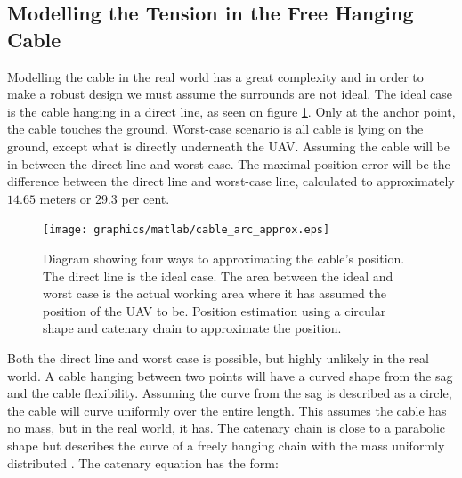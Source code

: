    

\subsection{Modelling the Tension in the Free Hanging Cable}
Modelling the cable in the real world has a great complexity and in order to make a robust design we must assume the surrounds are not ideal. The ideal case is the cable hanging in a direct line, as seen on figure \ref{fig:cable_model_cases}. Only at the anchor point, the cable touches the ground. Worst-case scenario is all cable is lying on the ground, except what is directly underneath the UAV. Assuming the cable will be in between the direct line and worst case. The maximal position error will be the difference between the direct line and worst-case line, calculated to approximately $14.65$ meters or 29.3 per cent.

\newpage

\begin{figure}[H]
\centering
\texttt{[image: graphics/matlab/cable\_arc\_approx.eps]}
\caption[Diagram showing four ways of approximating the cable's position.]{Diagram showing four ways to approximating the cable's position. The direct line is the ideal case. The area between the ideal and worst case is the actual working area where it has assumed the position of the UAV to be. Position estimation using a circular shape and catenary chain to approximate the position.}
\label{fig:cable_model_cases}
\end{figure}

\noindent
Both the direct line and worst case is possible, but highly unlikely in the real world. A cable hanging between two points will have a curved shape from the sag and the cable flexibility. Assuming the curve from the sag is described as a circle, the cable will curve uniformly over the entire length. This assumes the cable has no mass, but in the real world, it has.
The catenary chain is close to a parabolic shape but describes the curve of a freely hanging chain with the mass uniformly distributed \cite{Whewelll1833}. The catenary equation has the form:

